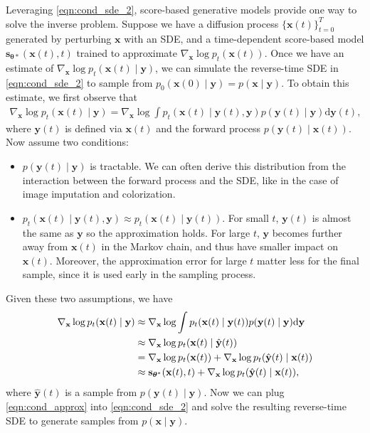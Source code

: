 \documentclass{article} \usepackage{iclr2021_conference,times}
\newcommand{\ud}{\mathrm{d}}
\newcommand{\bfx}{\mathbf{x}}
\newcommand{\bftheta}{{\boldsymbol{\theta}}}
\newcommand{\bfy}{\mathbf{y}}
\newcommand{\bfs}{\mathbf{s}}
\begin{document}
Leveraging \cref{eqn:cond_sde_2}, score-based generative models provide one way to solve the inverse problem. Suppose we have a diffusion process $\{\bfx(t)\}_{t=0}^T$ generated by perturbing $\bfx$ with an SDE, and a time-dependent score-based model $\bfs_{\bftheta*}(\bfx(t), t)$ trained to approximate $\nabla_\bfx \log p_t(\bfx(t))$. Once we have an estimate of $\nabla_\bfx \log p_t(\bfx(t) \mid \bfy)$, we can simulate the reverse-time SDE in \cref{eqn:cond_sde_2} to sample from $p_0(\bfx(0) \mid \bfy) = p(\bfx \mid \bfy)$. To obtain this estimate, we first observe that
\begin{align*}
    \nabla_\bfx \log p_t(\bfx(t) \mid \bfy) = \nabla_\bfx \log \int p_t(\bfx(t) \mid \bfy(t), \bfy) p(\bfy(t) \mid \bfy) \ud \bfy(t),
\end{align*}
where $\bfy(t)$ is defined via $\bfx(t)$ and the forward process $p(\bfy(t) \mid \bfx(t))$. Now assume two conditions:
\begin{itemize}
    \item $p(\bfy(t) \mid \bfy)$ is tractable. We can often derive this distribution from the interaction between the forward process and the SDE, like in the case of image imputation and colorization.
    \item $p_t(\bfx(t) \mid \bfy(t), \bfy) \approx p_t(\bfx(t) \mid \bfy(t))$. For small $t$, $\bfy(t)$ is almost the same as $\bfy$ so the approximation holds. For large $t$, $\bfy$ becomes further away from $\bfx(t)$ in the Markov chain, and thus have smaller impact on $\bfx(t)$. Moreover, the approximation error for large $t$ matter less for the final sample, since it is used early in the sampling process.
\end{itemize}
Given these two assumptions, we have
\begin{align}
    \nabla_\bfx \log p_t(\bfx(t) \mid \bfy) &\approx \nabla_\bfx \log \int p_t(\bfx(t) \mid \bfy(t)) p(\bfy(t) \mid \bfy) \ud \bfy \notag\\
    &\approx \nabla_\bfx \log p_t(\bfx(t) \mid \hat{\bfy}(t)) \notag\\
    &= \nabla_\bfx \log p_t(\bfx(t)) + \nabla_\bfx \log p_t(\hat{\bfy}(t) \mid \bfx(t)) \notag\\
    &\approx \bfs_{\bftheta^*}(\bfx(t), t) + \nabla_\bfx \log p_t(\hat{\bfy}(t) \mid \bfx(t)), \label{eqn:cond_approx}
\end{align}
where $\hat{\bfy}(t)$ is a sample from $p(\bfy(t) \mid \bfy)$. Now we can plug \cref{eqn:cond_approx} into \cref{eqn:cond_sde_2} and solve the resulting reverse-time SDE to generate samples from $p(\bfx \mid \bfy)$.
\end{document}
